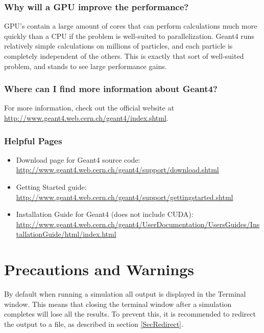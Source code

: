 \documentclass[12pt]{article}
\begin{document}
\subsubsection{Why will a GPU improve the performance?}
GPU's contain a large amount of cores that can perform calculations much more quickly than a CPU if the problem is well-suited to parallelization. Geant4 runs relatively simple calculations on millions of particles, and each particle is completely independent of the others. This is exactly that sort of well-suited problem, and stands to see large performance gains.

\subsubsection{Where can I find more information about Geant4?}
For more information, check out the official website at \url{http://www.geant4.web.cern.ch/geant4/index.shtml}.

\subsubsection{Helpful Pages}
\begin{itemize}
\item Download page for Geant4 source code: \url{http://www.geant4.web.cern.ch/geant4/support/download.shtml}
\item Getting Started guide: \url{http://www.geant4.web.cern.ch/geant4/support/gettingstarted.shtml}
\item Installation Guide for Geant4 (does not include CUDA): \url{http://www.geant4.web.cern.ch/geant4/UserDocumentation/UsersGuides/InstallationGuide/html/index.html}
\end{itemize}

\section{Precautions and Warnings}
By default when running a simulation all output is displayed in the Terminal window. This means that closing the terminal window after a simulation completes will lose all the results. To prevent this, it is recommended to redirect the output to a file, as described in section \ref{SecRedirect}.
\end{document}
